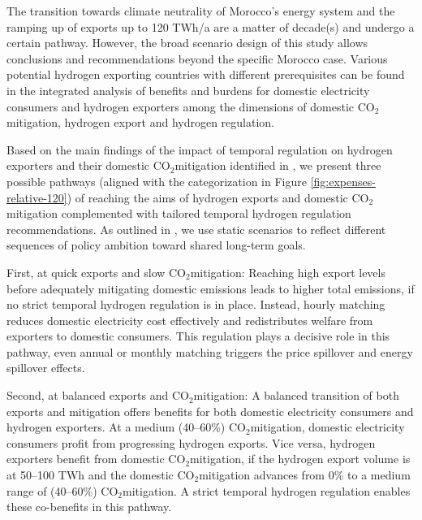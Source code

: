 \documentclass[5p,numafflabel]{elsarticle}
\newcommand{\co}{\ce{CO2}~}
\def\co{CO${}_2${\:}}
\begin{document}
The transition towards climate neutrality of Morocco's energy system and the ramping up of exports up to 120 TWh/a are a matter of decade(s) and undergo a certain pathway. 
However, the broad scenario design of this study allows conclusions and recommendations beyond the specific Morocco case.
Various potential hydrogen exporting countries with different prerequisites can be found in the integrated analysis of benefits and burdens for domestic electricity consumers and hydrogen exporters among the dimensions of domestic \co mitigation, hydrogen export and hydrogen regulation.

Based on the main findings of the impact of temporal regulation on hydrogen exporters and their domestic \co mitigation identified in , we present three possible pathways (aligned with the categorization in Figure \ref{fig:expenses-relative-120}) of reaching the aims of hydrogen exports and domestic \co mitigation complemented with tailored temporal hydrogen regulation recommendations.
As outlined in , we use static scenarios to reflect different sequences of policy ambition toward shared long-term goals.

First, at quick exports and slow \co mitigation: Reaching high export levels before adequately mitigating domestic emissions leads to higher total emissions, if no strict temporal hydrogen regulation is in place. Instead, hourly matching reduces domestic electricity cost effectively and redistributes welfare from exporters to domestic consumers. This regulation plays a decisive role in this pathway, even annual or monthly matching triggers the price spillover and energy spillover effects.

Second, at balanced exports and \co mitigation: A balanced transition of both exports and mitigation offers benefits for both domestic electricity consumers and hydrogen exporters. At a medium (40--60\%) \co mitigation, domestic electricity consumers profit from progressing hydrogen exports. Vice versa, hydrogen exporters benefit from domestic \co mitigation, if the hydrogen export volume is at 50--100 TWh and the domestic \co mitigation advances from 0\% to a medium range of (40--60\%) \co mitigation. A strict temporal hydrogen regulation enables these co-benefits in this pathway.
\end{document}
